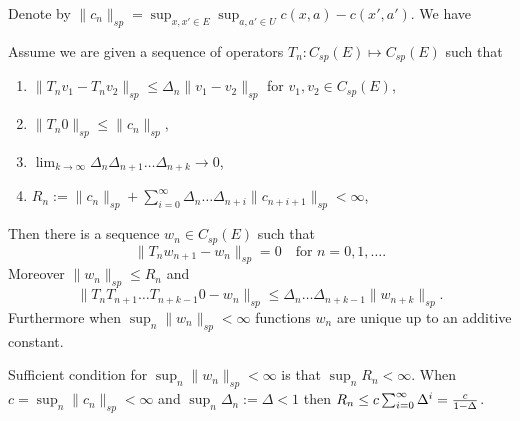 \documentclass[10pt,english]{extarticle}
\begin{document}
Denote by $\|c_n\|_{sp}=\sup_{x,x'\in E} \sup_{a,a'\in U} c(x,a)-c(x',a')$. We  have
\begin{theorem}\label{mtech}

Assume we are given a sequence of operators $T_n: C_{sp}(E)\mapsto C_{sp}(E)$ such that
\begin{enumerate}
\item[({i})] $\|T_nv_1-T_nv_2\|_{sp}\leq \Delta_n \|v_1-v_2\|_{sp}$ for $v_1,v_2\in C_{sp}(E)$,
\item[({ii})] $\|T_n0\|_{sp}\leq \|c_n\|_{sp}$,
\item[({iii})]  $\lim_{k\to \infty} \Delta_n\Delta_{n+1}\ldots\Delta_{n+k}\to 0$,
\item[({iv})] $R_n:=\|c_n\|_{sp} + \sum_{i=0}^\infty \Delta_n\ldots\Delta_{n+i}\|c_{n+i+1}\|_{sp} <\infty$,
\end{enumerate}
Then there is a sequence $w_n\in C_{sp}(E)$ such that
\begin{equation}
\|T_n w_{n+1} - w_n\|_{sp}=0 \quad \mbox{for $n=0,1,\ldots$}.
\end{equation}
Moreover $\|w_n\|_{sp}\leq R_n$ and
\begin{equation}\label{impine}
\|T_nT_{n+1}\ldots T_{n+k-1}0-w_n\|_{sp}\leq  \Delta_n\ldots \Delta_{n+k-1}\|w_{n+k}\|_{sp}.
\end{equation}
Furthermore when $\sup_n \|w_n\|_{sp}<\infty$ functions $w_n$ are unique up to an additive constant.
\end{theorem}
\begin{remark}
Sufficient condition for $\sup_n\|w_n\|_{sp}<\infty$ is that $\sup_n R_n<\infty$. When $c=\sup_n \|c_n\|_{sp}<
\infty$ and $\sup_n \Delta_n:=\Delta < 1$  then $R_n\leq c \sum_{i=0}^\infty \Delta^{i}={c\over 1-\Delta}$.
\end{remark}
\end{document}

